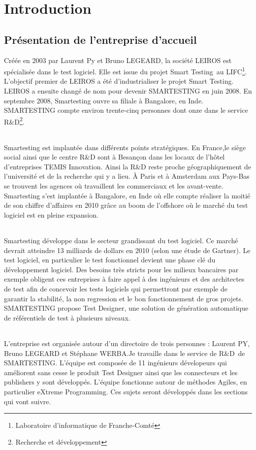 \chapter{Introduction}

\section{Présentation de l'entreprise d'accueil}
Créée en 2003 par Laurent Py et Bruno LEGEARD, la société LEIROS est spécialisée dans le test logiciel. Elle est issue du projet Smart Testing\texttrademark ~au LIFC\footnote{Laboratoire d'informatique de Franche-Comté}. L'objectif premier de LEIROS a été d'industrialiser le projet Smart Testing\texttrademark.  LEIROS a ensuite changé de nom pour devenir SMARTESTING en juin 2008. En septembre 2008, Smartesting ouvre sa filiale à Bangalore, en Inde. SMARTESTING compte environ trente-cinq personnes dont onze dans le service R\&D{}\footnote{Recherche et développement}.

\subparagraph*{}
Smartesting est implantée dans différents points stratégiques. En France,le siège social ainsi que le centre R\&D sont à Besançon dans les locaux de l'hôtel d'entreprises TEMIS Innovation. Ainsi la R\&D reste proche géographiquement de l'université et de la recherche qui y a lieu. À Paris et à Amsterdam aux Pays-Bas se trouvent les agences où travaillent les commerciaux et les avant-vente. Smartesting s'est implantée à Bangalore, en Inde où elle compte réaliser la moitié de son chiffre d'affaires en 2010 grâce au boom de l'offshore où le marché du test logiciel est en pleine expansion.


\subparagraph*{}
Smartesting développe dans le secteur grandissant du test logiciel. Ce marché devrait atteindre 13 milliards de dollars en 2010 (selon une étude de Gartner). Le test logiciel, en particulier le test fonctionnel devient une phase clé du développement logiciel. Des besoins très stricts pour les milieux bancaires par exemple obligent ces entreprises à faire appel à des ingénieurs et des architectes de test afin de concevoir les tests logiciels qui permettront par exemple de garantir la stabilité, la non regression et le bon fonctionnement de gros projets. SMARTESTING propose Test Designer, une solution de génération automatique de référentiels de test à plusieurs niveaux.

\subparagraph*{}
L'entreprise est organisée autour d'un directoire de trois personnes : Laurent PY, Bruno LEGEARD et Stéphane WERBA.Je travaille dans le service de R\&D{}\ de SMARTESTING.  L'équipe est composée de 11 ingénieurs dévelopeurs qui améliorent sans cesse le produit Test Designer ainsi que les connecteurs et les publishers y sont développés. L'équipe fonctionne autour de méthodes Agiles, en particulier eXtreme Programming. Ces sujets seront développés dans les sections qui vont suivre.

